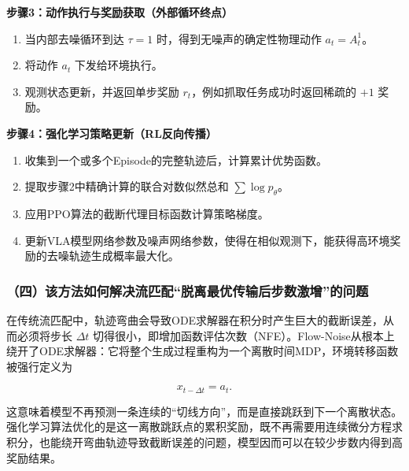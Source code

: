 \textbf{步骤3：动作执行与奖励获取（外部循环终点）}

\begin{enumerate}
\def\labelenumi{\arabic{enumi}.}
\tightlist
\item
  当内部去噪循环到达 \(\tau=1\) 时，得到无噪声的确定性物理动作 \(a_t=A_t^1\)。
\item
  将动作 \(a_t\) 下发给环境执行。
\item
  观测状态更新，并返回单步奖励 \(r_t\)，例如抓取任务成功时返回稀疏的 \(+1\) 奖励。
\end{enumerate}

\textbf{步骤4：强化学习策略更新（RL反向传播）}

\begin{enumerate}
\def\labelenumi{\arabic{enumi}.}
\tightlist
\item
  收集到一个或多个Episode的完整轨迹后，计算累计优势函数。
\item
  提取步骤2中精确计算的联合对数似然总和 \(\sum\log p_\theta\)。
\item
  应用PPO算法的截断代理目标函数计算策略梯度。
\item
  更新VLA模型网络参数及噪声网络参数，使得在相似观测下，能获得高环境奖励的去噪轨迹生成概率最大化。
\end{enumerate}

\hypertarget{ux56dbux8be5ux65b9ux6cd5ux5982ux4f55ux89e3ux51b3ux6d41ux5339ux914dux8131ux79bbux6700ux4f18ux4f20ux8f93ux540eux6b65ux6570ux6fc0ux589eux7684ux95eeux9898}{%
\subsubsection{（四）该方法如何解决流匹配``脱离最优传输后步数激增''的问题}\label{ux56dbux8be5ux65b9ux6cd5ux5982ux4f55ux89e3ux51b3ux6d41ux5339ux914dux8131ux79bbux6700ux4f18ux4f20ux8f93ux540eux6b65ux6570ux6fc0ux589eux7684ux95eeux9898}}

在传统流匹配中，轨迹弯曲会导致ODE求解器在积分时产生巨大的截断误差，从而必须将步长 \(\Delta t\) 切得很小，即增加函数评估次数（NFE）。Flow-Noise从根本上绕开了ODE求解器：它将整个生成过程重构为一个离散时间MDP，环境转移函数被强行定义为

\[
x_{t-\Delta t}=a_t.
\]

这意味着模型不再预测一条连续的``切线方向''，而是直接跳跃到下一个离散状态。强化学习算法优化的是这一离散跳跃点的累积奖励，既不再需要用连续微分方程求积分，也能绕开弯曲轨迹导致截断误差的问题，模型因而可以在较少步数内得到高奖励结果。

